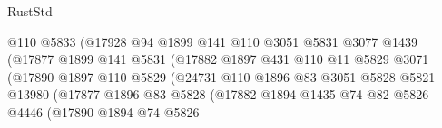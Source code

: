 \begin{lexlean}{RustStd}
\begin{coremodule}
                                        @110
                                        @5833
                                        (@17928
                                          @94
                                          @1899
                                          @141
                                          @110
                                          @3051
                                          @5831
                                          @3077
                                          @1439
                                          (@17877
                                            @1899
                                            @141
                                            @5831
                                            (@17882
                                              @1897
                                              @431
                                              @110
                                              @11
                                              @5829
                                              @3071
                                              (@17890
                                                @1897
                                                @110
                                                @5829
                                                (@24731
                                                  @110
                                                  @1896
                                                  @83
                                                  @3051
                                                  @5828
                                                  @5821
                                                  @13980
                                                  (@17877
                                                    @1896
                                                    @83
                                                    @5828
                                                    (@17882
                                                      @1894
                                                      @1435
                                                      @74
                                                      @82
                                                      @5826
                                                      @4446
                                                      (@17890
                                                        @1894
                                                        @74
                                                        @5826

\end{coremodule}
\end{lexlean}

